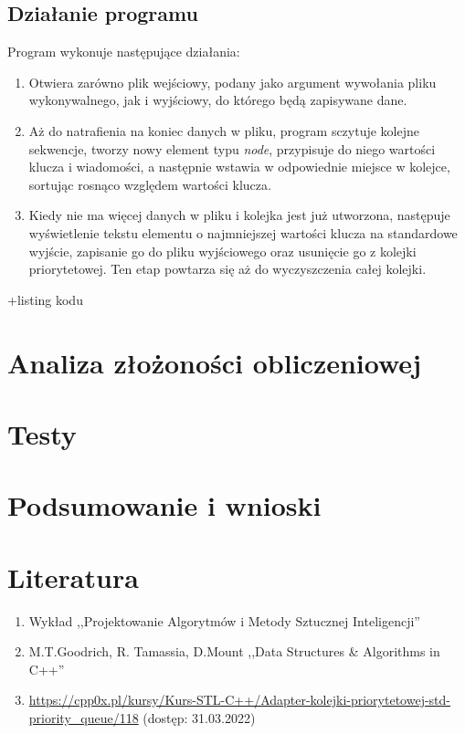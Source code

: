 \documentclass[12pt]{article}
\begin{document}
\subsection{Działanie programu}
Program wykonuje następujące działania:
\begin{enumerate}
    \item Otwiera zarówno plik wejściowy, podany jako argument wywołania pliku wykonywalnego, 
    jak i wyjściowy, do którego będą zapisywane dane.
    \item Aż do natrafienia na koniec danych w pliku, program sczytuje kolejne sekwencje, 
    tworzy nowy element typu \textit{node}, przypisuje do niego wartości klucza i wiadomości,
    a następnie wstawia w odpowiednie miejsce w kolejce, sortując rosnąco względem wartości klucza.  
    \item Kiedy nie ma więcej danych w pliku i kolejka jest już utworzona, następuje wyświetlenie
    tekstu elementu o najmniejszej wartości klucza na standardowe wyjście, zapisanie go do pliku 
    wyjściowego oraz usunięcie go z kolejki priorytetowej. Ten etap powtarza się aż do wyczyszczenia 
    całej kolejki.   
\end{enumerate}


\colorbox{Dandelion}{+listing kodu}

\section{Analiza złożoności obliczeniowej}


\section{Testy}


\section{Podsumowanie i wnioski}


\section{Literatura}
\begin{enumerate}
    \footnotesize
    \item Wykład ,,Projektowanie Algorytmów i Metody Sztucznej Inteligencji''
    \item M.T.Goodrich, R. Tamassia, D.Mount ,,Data Structures \& Algorithms in C++''
    \item \url{ https://cpp0x.pl/kursy/Kurs-STL-C++/Adapter-kolejki-priorytetowej-std-priority_queue/118} (dostęp: 31.03.2022)
\end{enumerate}
\end{document}
